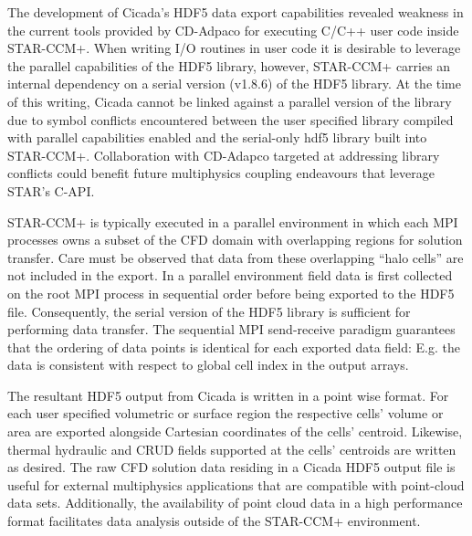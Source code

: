 
The development of Cicada's HDF5 data export capabilities revealed weakness in the current tools provided by CD-Adpaco for executing C/C++ user code inside STAR-CCM+.  When writing I/O routines in user code it is desirable to leverage the parallel capabilities of the HDF5 library, however, STAR-CCM+ carries an internal dependency on a serial version (v1.8.6) of the HDF5 library.  At the time of this writing, Cicada cannot be linked against a parallel version of the library due to symbol conflicts encountered between the user specified library compiled with parallel capabilities enabled and the serial-only hdf5 library built into STAR-CCM+.
Collaboration with CD-Adapco targeted at addressing library conflicts could benefit future multiphysics coupling endeavours that leverage STAR's C-API.

STAR-CCM+ is typically executed in a parallel environment in which each MPI processes owns a subset of the CFD domain with overlapping regions for solution transfer.  Care must be observed that data from these overlapping ``halo cells'' are not included in the export.  In a parallel environment field data is first collected on the root MPI process in sequential order before being exported to the HDF5 file.  Consequently, the serial version of the HDF5 library is sufficient for performing data transfer.  The sequential MPI send-receive paradigm guarantees that the ordering of data points is identical for each exported data field: E.g. the data is consistent with respect to global cell index in the output arrays.   

The resultant HDF5 output from Cicada is written in a point wise format.  For each user specified volumetric or surface region the respective cells' volume or area are exported alongside Cartesian coordinates of the cells' centroid.  Likewise, thermal hydraulic and CRUD fields supported at the cells' centroids are written as desired.  The raw CFD solution data residing in a Cicada HDF5 output file is useful for external multiphysics applications that are compatible with point-cloud data sets.  Additionally, the availability of point cloud data in a high performance format facilitates data analysis outside of the STAR-CCM+ environment.  

